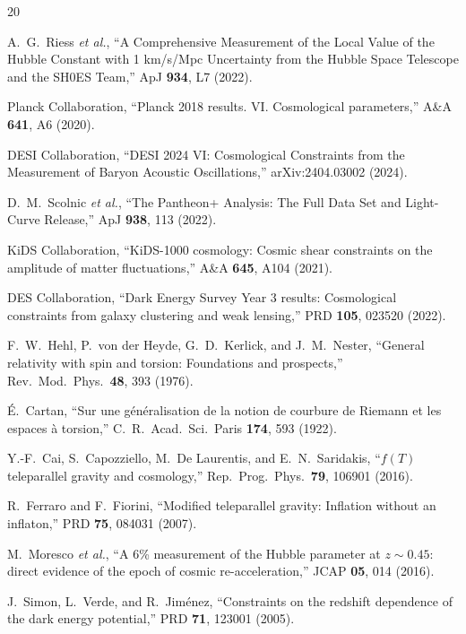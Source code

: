 \documentclass[twocolumn,prd,superscriptaddress,nofootinbib]{revtex4-2}
\begin{document}
\begin{thebibliography}{20}

A.~G.~Riess \textit{et al.},
``A Comprehensive Measurement of the Local Value of the Hubble Constant with 1 km/s/Mpc Uncertainty from the Hubble Space Telescope and the SH0ES Team,''
ApJ \textbf{934}, L7 (2022).

Planck Collaboration,
``Planck 2018 results. VI. Cosmological parameters,''
A\&A \textbf{641}, A6 (2020).

DESI Collaboration,
``DESI 2024 VI: Cosmological Constraints from the Measurement of Baryon Acoustic Oscillations,''
arXiv:2404.03002 (2024).

D.~M.~Scolnic \textit{et al.},
``The Pantheon+ Analysis: The Full Data Set and Light-Curve Release,''
ApJ \textbf{938}, 113 (2022).

KiDS Collaboration,
``KiDS-1000 cosmology: Cosmic shear constraints on the amplitude of matter fluctuations,''
A\&A \textbf{645}, A104 (2021).

DES Collaboration,
``Dark Energy Survey Year 3 results: Cosmological constraints from galaxy clustering and weak lensing,''
PRD \textbf{105}, 023520 (2022).

F.~W.~Hehl, P.~von der Heyde, G.~D.~Kerlick, and J.~M.~Nester,
``General relativity with spin and torsion: Foundations and prospects,''
Rev.\ Mod.\ Phys.\ \textbf{48}, 393 (1976).

\'E.~Cartan,
``Sur une g\'en\'eralisation de la notion de courbure de Riemann et les espaces \`a torsion,''
C.~R.\ Acad.\ Sci.\ Paris \textbf{174}, 593 (1922).

Y.-F.~Cai, S.~Capozziello, M.~De Laurentis, and E.~N.~Saridakis,
``$f(T)$ teleparallel gravity and cosmology,''
Rep.\ Prog.\ Phys.\ \textbf{79}, 106901 (2016).

R.~Ferraro and F.~Fiorini,
``Modified teleparallel gravity: Inflation without an inflaton,''
PRD \textbf{75}, 084031 (2007).

M.~Moresco \textit{et al.},
``A 6\% measurement of the Hubble parameter at $z \sim 0.45$: direct evidence of the epoch of cosmic re-acceleration,''
JCAP \textbf{05}, 014 (2016).

J.~Simon, L.~Verde, and R.~Jim\'enez,
``Constraints on the redshift dependence of the dark energy potential,''
PRD \textbf{71}, 123001 (2005).


\end{thebibliography}
\end{document}
